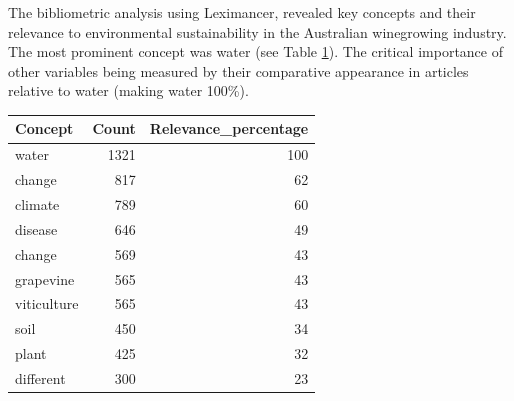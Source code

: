 The bibliometric analysis using Leximancer, revealed key concepts and their relevance to environmental sustainability in the Australian winegrowing industry. The most prominent concept was water (see Table \ref{tab:lexi}). The critical importance of other variables being measured by their comparative appearance in articles relative to water (making water 100\%).


\begin{table}[h]\label{tab:lexi}
    \begin{tabular}{@{}lrr@{}}
    \toprule
    \textbf{Concept} & \multicolumn{1}{l}{\textbf{Count}} & \multicolumn{1}{l}{\textbf{Relevance_percentage}} \\ \midrule
    water & 1321 & 100 \\
    change & 817 & 62 \\
    climate & 789 & 60 \\
    disease & 646 & 49 \\
    change & 569 & 43 \\
    grapevine & 565 & 43 \\
    viticulture & 565 & 43 \\
    soil & 450 & 34 \\
    plant & 425 & 32 \\
    different & 300 & 23 \\ \bottomrule
    \end{tabular}
    \end{table}



